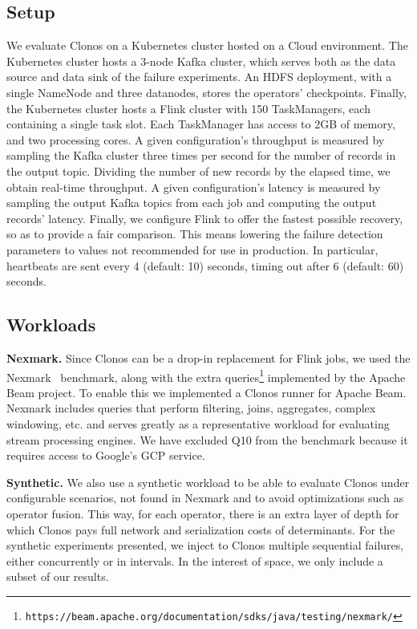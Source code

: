 \documentclass[sigconf]{acmart}
\newcommand{\para}[1]{\vspace{1mm}\noindent\textbf{#1.}}
\begin{document}
\subsection{Setup}
\label{sub:experimental-method}

We evaluate Clonos on a Kubernetes cluster hosted on a Cloud environment. The Kubernetes cluster hosts a 3-node Kafka cluster, which serves both as the data source and data sink of the failure experiments. An HDFS deployment, with a single NameNode and three datanodes, stores the operators' checkpoints. Finally, the  Kubernetes cluster hosts a Flink cluster with 150 TaskManagers, each containing a single task slot. Each TaskManager has access to 2GB of memory, and two processing cores. 
A given configuration's throughput is measured by sampling the Kafka cluster three times per second for the number of records in the output topic. Dividing the number of new records by the elapsed time, we obtain real-time throughput.
A given configuration's latency is measured by sampling the output Kafka topics from each job and computing the output records' latency.
Finally, we configure Flink to offer the fastest possible recovery, so as to provide a fair comparison. This means lowering the failure detection parameters to values not recommended for use in production. In particular, heartbeats are sent every 4 (default: 10) seconds, timing out after 6 (default: 60) seconds.

\subsection{Workloads}
\para{Nexmark} Since Clonos can be a drop-in replacement for Flink jobs, we used the Nexmark~\cite{tucker2008nexmark} benchmark, along with the extra queries\footnote{\texttt{https://beam.apache.org/documentation/sdks/java/testing/nexmark/}} implemented by the Apache Beam project. To enable this we implemented a Clonos runner for Apache Beam. Nexmark includes queries that perform filtering, joins, aggregates, complex windowing, etc. and serves greatly as a representative workload for evaluating stream processing engines. We have excluded Q10 from the benchmark because it requires access to Google's GCP service. 

\para{Synthetic}
We also use a synthetic workload to be able to evaluate Clonos under configurable scenarios, not found in Nexmark and to avoid optimizations such as operator fusion. This way, for each operator, there is an extra layer of depth for which Clonos pays full network and serialization costs of determinants. 
For the synthetic experiments presented, we inject to Clonos multiple sequential failures, either concurrently or in intervals. In the interest of space, we only include a subset of our results.
\end{document}
